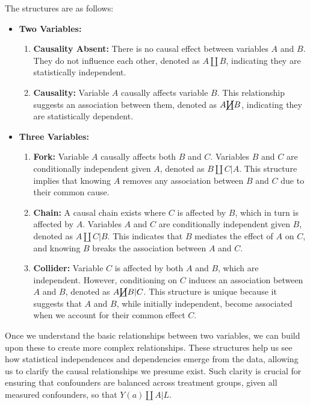 \documentclass[
  single column]{article}
\providecommand{\tightlist}{%
  \setlength{\itemsep}{0pt}\setlength{\parskip}{0pt}}\usepackage{longtable,booktabs,array}
\begin{document}
The structures are as follows:

\begin{itemize}
\tightlist
\item
  \textbf{Two Variables:}

  \begin{enumerate}
  \def\labelenumi{\arabic{enumi}.}
  \tightlist
  \item
    \textbf{Causality Absent:} There is no causal effect between
    variables \(A\) and \(B\). They do not influence each other, denoted
    as \(A \coprod B\), indicating they are statistically independent.
  \item
    \textbf{Causality:} Variable \(A\) causally affects variable \(B\).
    This relationship suggests an association between them, denoted as
    \(A \cancel\coprod B\), indicating they are statistically dependent.
  \end{enumerate}
\item
  \textbf{Three Variables:}

  \begin{enumerate}
  \def\labelenumi{\arabic{enumi}.}
  \setcounter{enumi}{2}
  \tightlist
  \item
    \textbf{Fork:} Variable \(A\) causally affects both \(B\) and \(C\).
    Variables \(B\) and \(C\) are conditionally independent given \(A\),
    denoted as \(B \coprod C | A\). This structure implies that knowing
    \(A\) removes any association between \(B\) and \(C\) due to their
    common cause.
  \item
    \textbf{Chain:} A causal chain exists where \(C\) is affected by
    \(B\), which in turn is affected by \(A\). Variables \(A\) and \(C\)
    are conditionally independent given \(B\), denoted as
    \(A \coprod C | B\). This indicates that \(B\) mediates the effect
    of \(A\) on \(C\), and knowing \(B\) breaks the association between
    \(A\) and \(C\).
  \item
    \textbf{Collider:} Variable \(C\) is affected by both \(A\) and
    \(B\), which are independent. However, conditioning on \(C\) induces
    an association between \(A\) and \(B\), denoted as
    \(A \cancel\coprod B | C\). This structure is unique because it
    suggests that \(A\) and \(B\), while initially independent, become
    associated when we account for their common effect \(C\).
  \end{enumerate}
\end{itemize}

Once we understand the basic relationships between two variables, we can
build upon these to create more complex relationships. These structures
help us see how statistical independences and dependencies emerge from
the data, allowing us to clarify the causal relationships we presume
exist. Such clarity is crucial for ensuring that confounders are
balanced across treatment groups, given all measured confounders, so
that \(Y(a) \coprod A | L\).
\end{document}
